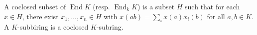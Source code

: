 A coclosed subset of $\operatorname{End} K$ (resp. $\operatorname{End}_k K$) is a subset $H$ such that for each $x \in H$, there exist $x_1, \ldots, x_n \in H$ with $x(ab) = \sum_i x(a)x_i(b)$ for all $a, b \in K$. A $K$-subbiring is a coclosed $K$-subring.
